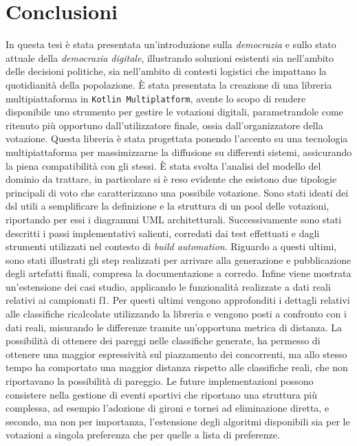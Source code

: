 \documentclass[12pt,a4paper,openright,twoside]{book}
\begin{document}
\chapter{Conclusioni}
In questa tesi è stata presentata un'introduzione sulla \textit{democrazia} e sullo stato attuale 
della \textit{democrazia digitale}, illustrando soluzioni esistenti sia nell'ambito delle decisioni
politiche, sia nell'ambito di contesti logistici che impattano la quotidianità della popolazione.
È stata presentata la creazione di una libreria multipiattaforma in \texttt{Kotlin Multiplatform},
avente lo scopo di rendere disponibile uno strumento per gestire le votazioni digitali, parametrandole
come ritenuto più opportuno dall'utilizzatore finale, ossia dall'organizzatore della votazione.
Questa libreria è stata  progettata ponendo l'accento su una tecnologia multipiattaforma per 
massimizzarne la diffusione su differenti sistemi, assicurando la piena compatibilità con gli stessi.
È stata svolta l'analisi del modello del dominio da trattare, in particolare si è reso evidente
che esistono due tipologie principali di voto che caratterizzano una possibile votazione.
Sono stati ideati dei \ac{dsl} utili a semplificare la definizione e la struttura di un pool delle votazioni,
riportando per essi i diagrammi UML architetturali.
Successivamente sono stati descritti i passi implementativi salienti, corredati dai test effettuati
e dagli strumenti utilizzati nel contesto di \textit{build automation}.
Riguardo a questi ultimi, sono stati illustrati gli step realizzati per arrivare alla generazione
e pubblicazione degli artefatti finali, compresa la documentazione a corredo.
Infine viene mostrata un'estensione dei casi studio, applicando le funzionalità realizzate a
dati reali relativi ai campionati \ac{f1}.
Per questi ultimi vengono approfonditi i dettagli relativi alle classifiche ricalcolate utilizzando
la libreria e vengono posti a confronto con i dati reali, misurando le differenze tramite un'opportuna
metrica di distanza. La possibilità di ottenere dei pareggi nelle classifiche generate, ha permesso di
ottenere una maggior espressività sul piazzamento dei concorrenti, ma allo stesso tempo ha comportato 
una maggior distanza rispetto alle classifiche reali, che non riportavano la possibilità di pareggio.
Le future implementazioni possono consistere nella gestione di eventi sportivi che riportano una
struttura più complessa, ad esempio l'adozione di gironi e tornei ad eliminazione diretta,
e secondo, ma non per importanza, l'estensione degli algoritmi disponibili sia per le votazioni a 
singola preferenza che per quelle a lista di preferenze.


\backmatter

\nocite{*} %




\end{document}
